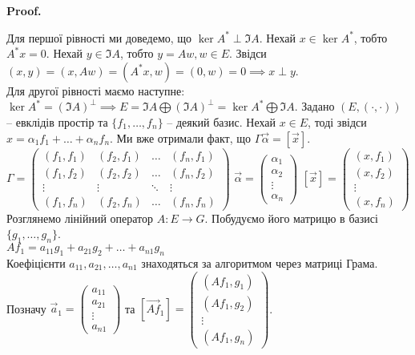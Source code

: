 \documentclass[a4paper, 10pt]{article}
\makeatletter
\theoremstyle{theoremdd}
\renewenvironment{proof}[1][Proof.\\]{\par
\pushQED{\hfill \qed}%
\normalfont \topsep6\p@\@plus6\p@\relax
\trivlist
\item\relax
{\bfseries
#1\@addpunct{.}}\hspace\labelsep\ignorespaces
}{%
\popQED\endtrivlist\@endpefalse
}
\makeatother
\begin{document}
\begin{proof}
Для першої рівності ми доведемо, що $\ker A^* \perp \Im A$. Нехай $x \in \ker A^*$, тобто $A^*x = 0$. Нехай $y \in \Im A$, тобто $y = Aw,w \in E$. Звідси $(x,y) = (x, Aw) = (A^*x, w) = (0, w) = 0 \implies x \perp y$. \\
Для другої рівності маємо наступне:\\
$\ker A^* = (\Im A)^{\perp} \implies E = \Im A \bigoplus (\Im A)^{\perp} = \ker A^* \bigoplus \Im A$.
\end{proof}
\noindent
Задано $(E,(\cdot,\cdot))$ -- евклідів простір та $\{f_1,\dots,f_n\}$ -- деякий базис. Нехай $x \in E$, тоді звідси $x = \alpha_1 f_1 + \dots + \alpha_n f_n$. Ми вже отримали факт, що $\Gamma \vec{\alpha} = [\vec{x}]$.\\
$\Gamma = \begin{pmatrix}
(f_1,f_1) & (f_2,f_1) & \dots & (f_n,f_1) \\
(f_1,f_2) & (f_2,f_2) & \dots & (f_n,f_2) \\
\vdots & \vdots & \ddots & \vdots \\
(f_1,f_n) & (f_2,f_n) & \dots & (f_n,f_n)
\end{pmatrix}$ \hspace{1cm}
$\vec{\alpha} = \begin{pmatrix}
\alpha_1 \\ \alpha_2 \\ \vdots \\ \alpha_n
\end{pmatrix}$ \hspace{1cm}
$[\vec{x}] = \begin{pmatrix}
(x,f_1) \\ (x,f_2) \\ \vdots \\ (x,f_n)
\end{pmatrix}$
\\
Розглянемо лінійний оператор $A \colon E \to G$. Побудуємо його матрицю в базисі $\{g_1,\dots,g_n\}$.\\
$Af_1 = a_{11}g_1 + a_{21}g_2 + \dots + a_{n1}g_n$\\
Коефіцієнти $a_{11},a_{21},\dots,a_{n1}$ знаходяться за алгоритмом через матриці Грама.\\
Позначу $\vec{a}_1 = \begin{pmatrix}
a_{11} \\ a_{21} \\ \vdots \\ a_{n1}
\end{pmatrix}$ та $[\overrightarrow{Af}_1] = \begin{pmatrix}
(Af_1,g_1) \\ (Af_1,g_2) \\ \vdots \\ (Af_1,g_n)
\end{pmatrix}$.\\
\end{document}
